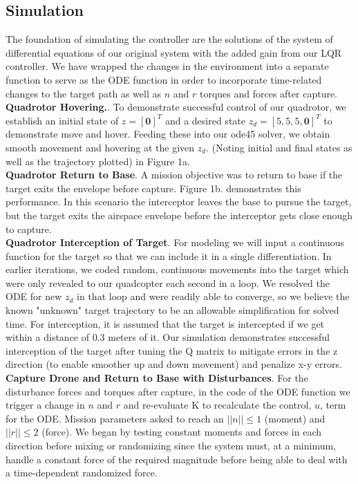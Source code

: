\documentclass{article}
\begin{document}
\begin{multicols}{2}
\section*{Simulation}
\noindent
The foundation of simulating the controller are the solutions of the system of differential equations of our original system with the added 
gain from our LQR controller.  We have wrapped the changes in the environment into a separate function to serve as the ODE 
function in order to incorporate time-related changes to the target path as well as $n$ and $r$ torques and forces after capture.\\
\textbf{Quadrotor Hovering.}. To demonstrate successful control of our quadrotor, we establish an initial state of $z=[\mathbf{0}]^T$ and 
a desired state $z_d=[5,5,5,\boldsymbol{0}]^T $ to demonstrate move and hover.  Feeding these into our ode45 solver, we obtain 
smooth movement and hovering at the given $z_d$.  (Noting initial and final states as well as the trajectory plotted) in Figure 1a.\\
\textbf{Quadrotor Return to Base}. A mission objective was to return to base if the target exits the envelope before capture.  
Figure 1b. demonstrates this performance. In this scenario the interceptor leaves the base to pursue the target, but the target exits 
the airspace envelope before the interceptor gets close enough to capture.\\
\textbf{Quadrotor Interception of Target}. For modeling we will input a continuous function for the target so that we can include it in a single differentiation.  In earlier iterations, we coded random, continuous movements into the target which were only 
revealed to our quadcopter each second in a loop.  We resolved the ODE for new $z_d$ in that loop and were readily able to converge, so we believe the known "unknown" target trajectory to be an allowable simplification for solved time. For interception, it is assumed that the target is intercepted if we get within a distance of 0.3 meters of it. Our simulation demonstrates successful interception of the target after tuning the Q matrix to mitigate errors in the z direction (to enable smoother up and down 
movement) and penalize x-y errors.  \\
\textbf{Capture Drone and Return to Base  with Disturbances}.  For the disturbance 
forces and torques after capture,  in the code of the ODE function we trigger a 
change in $n$ and $r$ and re-evaluate K  to recalculate the control, $u$, term for the 
ODE.  Mission parameters asked to reach an $||n||\leq1$ (moment) and $||r||\leq2$ (force). We began by testing constant moments and forces in each direction before mixing or randomizing since the system must, at a minimum, handle a constant force of the required magnitude before being able to deal with a time-dependent randomized force.

\end{multicols}
\end{document}
